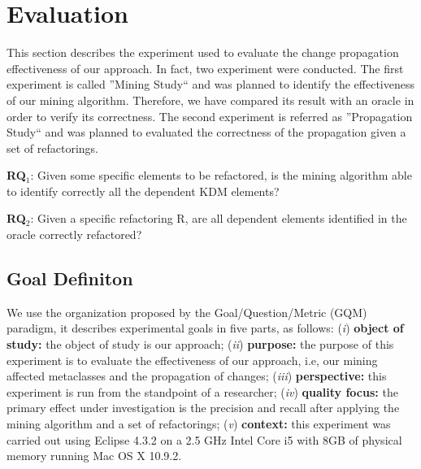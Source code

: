 
\section{Evaluation}\label{sec:evaluation}

This section describes the experiment used to evaluate the change propagation effectiveness of our approach. In fact, two experiment were conducted. The first experiment is called ''Mining Study`` and was planned to identify the effectiveness of our  mining algorithm. Therefore, we have compared its result with an oracle in order to verify its correctness. The second experiment is referred as ''Propagation Study`` and was planned to evaluated the correctness of the propagation given a set of refactorings. 


\textbf{RQ$_{1}$}: Given some specific elements to be refactored, is the mining algorithm able to identify correctly all the dependent KDM elements?

\textbf{RQ$_{2}$}: Given a specific refactoring R, are all dependent elements identified in the oracle correctly refactored?
 

\subsection{Goal Definiton}\label{sec:goal_definition}

We use the organization proposed by the Goal/Question/Metric (GQM) paradigm, it describes experimental goals in five parts, as follows:  (\textit{i}) \textbf{object of study:} the object of study is our approach; (\textit{ii}) \textbf{purpose:} the purpose of this experiment is to evaluate the effectiveness of our approach, i.e, our mining affected metaclasses and the propagation of changes; (\textit{iii}) \textbf{perspective:} this experiment is run from the standpoint of a researcher; (\textit{iv}) \textbf{quality focus:} the primary effect under investigation is the precision and recall after applying the mining algorithm and a set of refactorings; (\textit{v}) \textbf{context:} this experiment was carried out using Eclipse 4.3.2 on a 2.5 GHz Intel Core i5 with 8GB of physical memory running Mac OS X 10.9.2.

